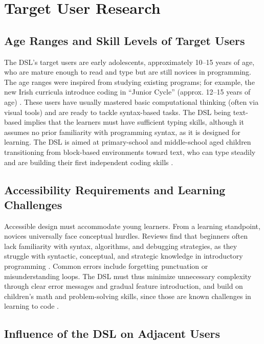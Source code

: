 \section{Target User Research}

\subsection{Age Ranges and Skill Levels of Target Users}

The DSL's target users are early adolescents, approximately 10--15 years of age, who are mature enough to read and type but are still novices in programming. 
The age ranges were inspired from studying existing programs; for example, the new Irish curricula introduce coding in ``Junior Cycle'' (approx. 12--15 years of age) \cite{noone_visual_2018}. 
These users have usually mastered basic computational thinking (often via visual tools) and are ready to tackle syntax-based tasks. 
The DSL being text-based implies that the learners must have sufficient typing skills, although it assumes no prior familiarity with programming syntax, as it is designed for learning. 
The DSL is aimed at primary-school and middle-school aged children transitioning from block-based environments toward text, who can type steadily and are building their first independent coding skills \cite{noone_visual_2018, saito_comparison_2017}.

\subsection{Accessibility Requirements and Learning Challenges}

Accessible design must accommodate young learners. 
From a learning standpoint, novices universally face conceptual hurdles. 
Reviews find that beginners often lack familiarity with syntax, algorithms, and debugging strategies, as they struggle with syntactic, conceptual, and strategic knowledge in introductory programming \cite{neuwinger_systematic_2025}. 
Common errors include forgetting punctuation or misunderstanding loops. 
The DSL must thus minimize unnecessary complexity through clear error messages and gradual feature introduction, and build on children's math and problem-solving skills, since those are known challenges in learning to code \cite{neuwinger_systematic_2025, nadeem_enhancing_2021}.

\subsection{Influence of the DSL on Adjacent Users}

